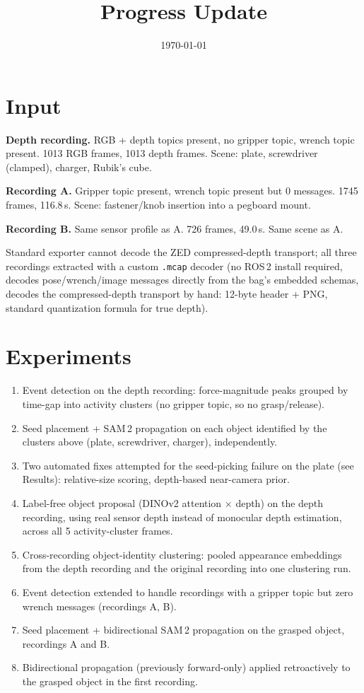 \documentclass[11pt]{article}
\title{\textbf{Progress Update}}
\date{\today}
\begin{document}
\maketitle

\section{Input}

\textbf{Depth recording.} RGB + depth topics present, no gripper topic,
wrench topic present. 1013 RGB frames, 1013 depth frames. Scene: plate,
screwdriver (clamped), charger, Rubik's cube.

\textbf{Recording A.} Gripper topic present, wrench topic present but 0
messages. 1745 frames, 116.8\,s. Scene: fastener/knob insertion into a
pegboard mount.

\textbf{Recording B.} Same sensor profile as A. 726 frames, 49.0\,s. Same
scene as A.

Standard exporter cannot decode the ZED compressed-depth transport; all
three recordings extracted with a custom \texttt{.mcap} decoder (no ROS\,2
install required, decodes pose/wrench/image messages directly from the
bag's embedded schemas, decodes the compressed-depth transport by hand:
12-byte header + PNG, standard quantization formula for true depth).

\section{Experiments}

\begin{enumerate}[noitemsep]
  \item Event detection on the depth recording: force-magnitude peaks
        grouped by time-gap into activity clusters (no gripper topic, so
        no grasp/release).
  \item Seed placement + SAM\,2 propagation on each object identified by
        the clusters above (plate, screwdriver, charger), independently.
  \item Two automated fixes attempted for the seed-picking failure on the
        plate (see Results): relative-size scoring, depth-based
        near-camera prior.
  \item Label-free object proposal (DINOv2 attention $\times$ depth) on
        the depth recording, using real sensor depth instead of monocular
        depth estimation, across all 5 activity-cluster frames.
  \item Cross-recording object-identity clustering: pooled appearance
        embeddings from the depth recording and the original recording
        into one clustering run.
  \item Event detection extended to handle recordings with a gripper
        topic but zero wrench messages (recordings A, B).
  \item Seed placement + bidirectional SAM\,2 propagation on the grasped
        object, recordings A and B.
  \item Bidirectional propagation (previously forward-only) applied
        retroactively to the grasped object in the first recording.
\end{enumerate}
\end{document}
